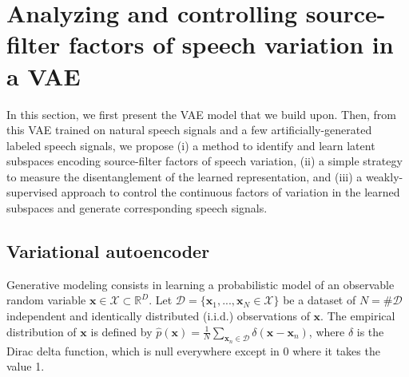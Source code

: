 \documentclass[review]{elsarticle}
\begin{document}
\section{Analyzing and controlling source-filter factors of speech variation in a VAE}
\label{sec:method}



In this section, we first present the VAE model that we build upon. Then, from this VAE trained on natural speech signals and a few artificially-generated labeled speech signals, we propose (i) a method to identify and learn latent subspaces encoding source-filter factors of speech variation, (ii) a simple strategy to measure the disentanglement of the learned representation, and (iii) a weakly-supervised approach to control the continuous factors of variation in the learned subspaces and generate corresponding speech signals.

\subsection{Variational autoencoder}
Generative modeling consists in learning a probabilistic model of an observable random variable $\mathbf{x} \in \mathcal{X} \subset \mathbb{R}^D$. Let $\mathcal{D} = \{\mathbf{x}_1, ..., \mathbf{x}_N \in \mathcal{X}\}$ be a dataset of $N = \# \mathcal{D}$ independent and identically distributed (i.i.d.) observations of $\mathbf{x}$. The empirical distribution of $\mathbf{x}$ is defined by $\hat{p}(\mathbf{x}) = \frac{1}{N}\sum_{\mathbf{x}_n \in \mathcal{D}} \delta(\mathbf{x} - \mathbf{x}_n)$,
where $\delta$ is the Dirac delta function, which is null everywhere except in 0 where it takes the value 1.
\end{document}
